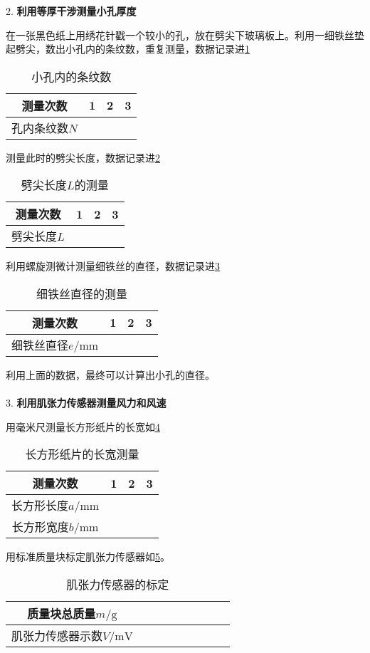 \documentclass[11pt,a4paper]{ctexart}
\newcommand{\emptyline}{\\ \ \\}
\begin{document}
2. \textbf{利用等厚干涉测量小孔厚度}
\par
在一张黑色纸上用绣花针戳一个较小的孔，放在劈尖下玻璃板上。利用一细铁丝垫起劈尖，数出小孔内的条纹数，重复测量，数据记录进\cref{table3}
\begin{table}[H]
\centering
\caption{小孔内的条纹数}
\label{table3}
\begin{tabular}{|c|p{12mm}|p{12mm}|p{12mm}|}
\hline
测量次数 & 1 &  2& 3  \\ \hline
孔内条纹数$N$ &  &  &   \\ \hline
\end{tabular}
\end{table}
\par
测量此时的劈尖长度，数据记录进\cref{table5}
\begin{table}[H]
\centering
\caption{劈尖长度$L$的测量}
\label{table5}
\begin{tabular}{|c|p{12mm}|p{12mm}|p{12mm}|}
\hline
测量次数 & 1 & 2 & 3  \\ \hline
劈尖长度$L$ &  &  &   \\ \hline
\end{tabular}
\end{table}
利用螺旋测微计测量细铁丝的直径，数据记录进\cref{table4}
\begin{table}[H]
\centering
\caption{细铁丝直径的测量}
\label{table4}
\begin{tabular}{|c|p{12mm}|p{12mm}|p{12mm}|}
\hline
测量次数 & 1 & 2 & 3  \\ \hline
细铁丝直径$e/\mathrm{mm}$ &  &  &   \\ \hline
\end{tabular}
\end{table}
利用上面的数据，最终可以计算出小孔的直径。
\emptyline
3. \textbf{利用肌张力传感器测量风力和风速}\par
用毫米尺测量长方形纸片的长宽如\cref{table6}
\begin{table}[H]
\centering
\caption{长方形纸片的长宽测量}
\label{table6}
\begin{tabular}{|c|p{12mm}|p{12mm}|p{12mm}|}
\hline
测量次数 & 1 & 2 & 3  \\ \hline
长方形长度$a/\mathrm{mm}$ &  &  &   \\ \hline
长方形宽度$b/\mathrm{mm}$ &  &  &   \\ \hline
\end{tabular}
\end{table}
用标准质量块标定肌张力传感器如\cref{table7}。
\begin{table}[H]
\centering
\caption{肌张力传感器的标定}
\label{table7}
\begin{tabular}{|c|p{10mm}|p{10mm}|p{10mm}|p{10mm}|p{10mm}|p{10mm}|p{10mm}|p{10mm}|}
\hline
质量块总质量$m/\mathrm{g}$ &  &  &  &  &        \\ \hline
肌张力传感器示数$V\mathrm{/mV}$ &  &  &  &  &        \\ \hline
\end{tabular}
\end{table}
\end{document}
